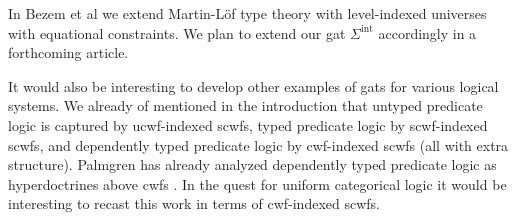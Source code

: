 \documentclass[11pt,a4paper]{article}
\theoremstyle{definition}
\def\leq{\mathrm{leq}}
\newcommand{\ty}{\mathrm{ty}}
\def\p{\mathrm{p}}
\def\q{\mathrm{q}}
\def\Sigmaint{\Sigma^\mathrm{int}}
\begin{document}
%

In Bezem et al \cite{BezemCDE22} we extend Martin-Löf type theory with level-indexed universes with equational constraints. We plan to extend our gat $\Sigmaint$ accordingly in a forthcoming article.

%
It would also be interesting to develop other examples of gats for various logical systems. We already of mentioned in the introduction that untyped predicate logic is captured by ucwf-indexed scwfs, typed predicate logic by scwf-indexed scwfs, and dependently typed predicate logic by cwf-indexed scwfs (all with extra structure). Palmgren has already analyzed dependently typed predicate logic as hyperdoctrines above cwfs \cite{Palmgren19}. In the quest for uniform categorical logic it would be interesting to recast this work in terms of cwf-indexed scwfs. 
\end{document}
